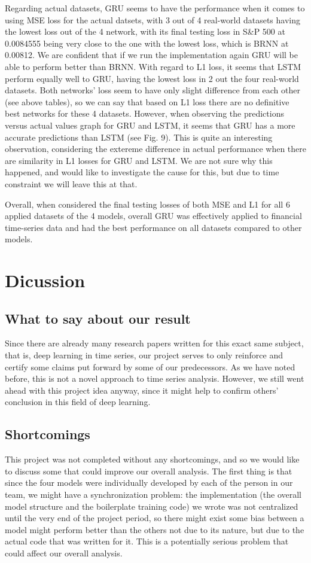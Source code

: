 \documentclass[letterpaper, 10 pt, conference]{ieeeconf}  %
\begin{document}
        Regarding actual datasets, GRU seems to have the performance when it comes to using MSE loss for the actual datsets, with 3 out of 4 real-world datasets having the lowest loss out of the 4 network, with its final testing loss in S\&P 500 at 0.0084555 being very close to the one with the lowest loss, which is BRNN at 0.00812. We are confident that if we run the implementation again GRU will be able to perform better than BRNN. With regard to L1 loss, it seems that LSTM perform equally well to GRU, having the lowest loss in 2 out the four real-world datasets. Both networks' loss seem to have only slight difference from each other (see above tables), so we can say that based on L1 loss there are no definitive best networks for these 4 datasets. However, when observing the predictions versus actual values graph for GRU and LSTM, it seems that GRU has a more accurate predictions than LSTM (see Fig. 9). This is quite an interesting observation, considering the extereme difference in actual performance when there are similarity in L1 losses for GRU and LSTM. We are not sure why this happened, and would like to investigate the cause for this, but due to time constraint we will leave this at that.
        
        Overall, when considered the final testing losses of both MSE and L1 for all 6 applied datasets of the 4 models, overall GRU was effectively applied to financial time-series data and had the best performance on all datasets compared to other models.

\section{Dicussion}
    \subsection{What to say about our result}
        Since there are already many research papers written for this exact same subject, that is, deep learning in time series, our project serves to only reinforce and certify some claims put forward by some of our predecessors. As we have noted before, this is not a novel approach to time series analysis. However, we still went ahead with this project idea anyway, since it might help to confirm others' conclusion in this field of deep learning.

    \subsection{Shortcomings}
        This project was not completed without any shortcomings, and so we would like to discuss some that could improve our overall analysis. The first thing is that since the four models were individually developed by each of the person in our team, we might have a synchronization problem: the implementation (the overall model structure and the boilerplate training code) we wrote was not centralized until the very end of the project period, so there might exist some bias between a model might perform better than the others not due to its nature, but due to the actual code that was written for it. This is a potentially serious problem that could affect our overall analysis.
\end{document}
